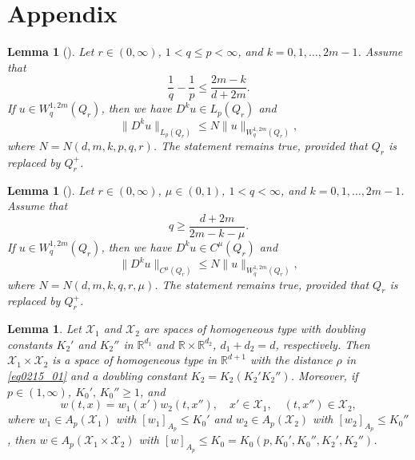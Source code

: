\documentclass[reqno]{amsart}
\numberwithin{equation}{section}
\theoremstyle{plain}
\newtheorem{lemma}[theorem]{Lemma}
\theoremstyle{definition}
\theoremstyle{remark}
\begin{document}
\section{Appendix}		\label{app}

\begin{lemma}[{\cite[Sec.10.2]{MR519341}}]			\label{0922.lem2}
Let $r\in (0,\infty)$, $1< q\le p <\infty$, and $k=0,1,\ldots,2m-1$.
Assume that 
\[
\frac{1}{q}-\frac{1}{p}\le \frac{2m-k}{d+2m}.
\]
If $u\in W^{1,2m}_q(Q_r)$, then we have $D^ku\in L_p(Q_r)$ and 
$$
\|D^ku\|_{L_p(Q_r)}\le N\|u\|_{W^{1,2m}_q(Q_r)},
$$
where $N=N(d,m,k,p,q,r)$.
The statement remains true, provided that $Q_r$ is replaced by $Q_r^+$.
\end{lemma}

\begin{lemma}[{\cite[Sec.18.12]{MR521808}}]		\label{0922.lem4}
Let $r\in (0,\infty)$, $\mu\in (0,1)$, $1<q<\infty$, and $k=0,1,\ldots,2m-1$.
Assume that
\[
q\ge\frac{d+2m}{2m-k-\mu}.
\]
If $u\in W^{1,2m}_q(Q_r)$, then we have $D^ku\in C^\mu(Q_r)$ and 
\begin{equation*}
\|D^k u\|_{C^\mu(Q_r)}\le N\|u\|_{W^{1,2m}_q(Q_r)},
\end{equation*}
where $N=N(d,m,k,q,r,\mu)$.
The statement remains true, provided that $Q_r$ is replaced by $Q_r^+$.
\end{lemma}

\begin{lemma}		\label{160629@lem1}
Let ${\mathcal{X}}_1$ and ${\mathcal{X}}_2$ are spaces of homogeneous type with doubling constants $K_2'$ and $K_2''$ in ${\mathbb{R}}^{d_1}$ and ${\mathbb{R}}\times {\mathbb{R}}^{d_2}$, $d_1+d_2=d$, respectively.
Then ${\mathcal{X}}_1\times {\mathcal{X}}_2$ is a space of homogeneous type in ${\mathbb{R}}^{d+1}$ with the distance $\rho$ in \eqref{eq0215_01} and  a doubling constant $K_2=K_2(K_2'K_2'')$.
Moreover, if $p\in (1,\infty)$, $K_0',\, K_0''\ge 1$, and 
$$
w(t,x)=w_1(x')w_2(t,x''), \quad x'\in {\mathcal{X}}_1, \quad (t,x'')\in {\mathcal{X}}_2,
$$
where $w_1\in A_p({\mathcal{X}}_1)$ with $[w_1]_{A_p}\le K_0'$ and $w_2\in A_p({\mathcal{X}}_2)$ with $[w_2]_{A_p}\le K_0''$, then 
$w\in A_p({\mathcal{X}}_1\times {\mathcal{X}}_2)$ with $[w]_{A_p}\le K_0=K_0(p,K_0',K_0'',K_2',K_2'')$.
\end{lemma}
\end{document}
